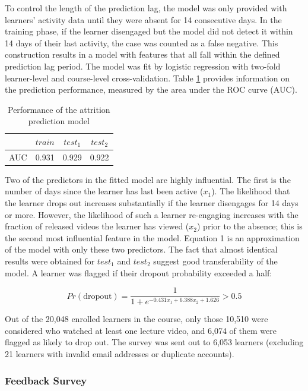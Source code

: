 \documentclass{sigchi}\usepackage[]{graphicx}\usepackage[]{color}
\begin{document}
To control the length of the prediction lag, the model was only provided with learners' activity data until they were absent for 14 consecutive days. In the training phase, if the learner disengaged but the model did not detect it within 14 days of their last activity, the case was counted as a false negative. This construction results in a model with features that all fall within the defined prediction lag period. The model was fit by logistic regression with two-fold learner-level and course-level cross-validation. Table \ref{tab:predAuc} provides information on the prediction performance, measured by the area under the ROC curve (AUC).

\begin{table}[h!]
\caption{Performance of the attrition prediction model}
\label{tab:predAuc}
\small
\center
\begin{tabular}{lccc}
\toprule
 & $train$ & $test_1$ & $test_2$ \\
\midrule
AUC &  0.931 & 0.929 & 0.922  \\
\bottomrule
\end{tabular}
\end{table}

Two of the predictors in the fitted model are highly influential. The first is the number of days since the learner has last been active ($x_{1}$). The likelihood that the learner drops out increases substantially if the learner disengages for 14 days or more. However, the likelihood of such a learner re-engaging increases with the fraction of released videos the learner has viewed ($x_{2}$) prior to the absence; this is the second most influential feature in the model. Equation 1 is an approximation of the model with only these two predictors. The fact that almost identical results were obtained for $test_1$ and $test_2$ suggest good transferability of the model. A learner was flagged if their dropout probability exceeded a half:

\begin{equation}
Pr(\text{dropout}) = \frac{1}{1+e^{-0.431x_1 + 6.388x_2 + 1.626}} > 0.5
\end{equation}

Out of the 20,048 enrolled learners in the course, only those 10,510 were considered who watched at least one lecture video, and 6,074 of them were flagged as likely to drop out. The survey was sent out to 6,053 learners (excluding 21 learners with invalid email addresses or duplicate accounts).


\subsubsection{Feedback Survey}
\end{document}
